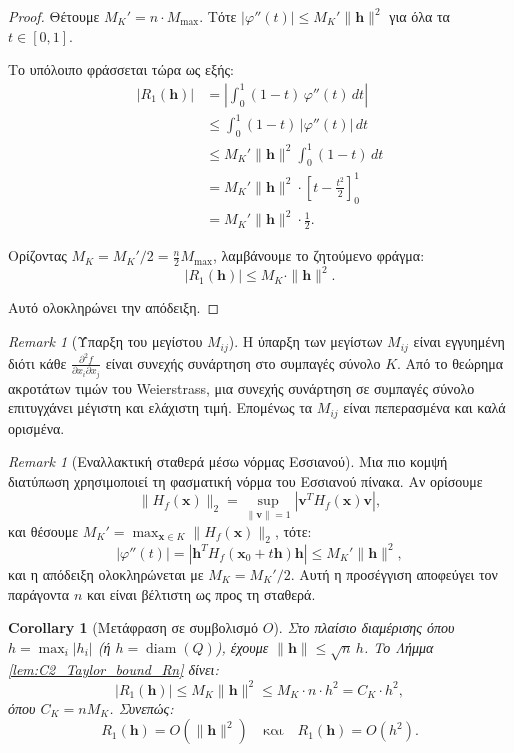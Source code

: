 \documentclass[10pt,a4paper,twoside,openany]{book}
\theoremstyle{plain}
\newtheorem{corollary}[theorem]{Corollary}
\theoremstyle{definition}
\theoremstyle{remark}
\newtheorem{remark}[theorem]{Remark}
\numberwithin{equation}{section}
\begin{document}
\begin{proof}
Θέτουμε \(M_K' = n \cdot M_{\max}\). Τότε \(|\varphi''(t)| \le M_K' \|\mathbf{h}\|^2\) για όλα τα \(t \in [0,1]\).

Το υπόλοιπο φράσσεται τώρα ως εξής:
\begin{align*}
|R_1(\mathbf{h})| &= \left| \int_0^1 (1-t) \, \varphi''(t) \, dt \right| \\
&\le \int_0^1 (1-t) \, |\varphi''(t)| \, dt \\
&\le M_K' \|\mathbf{h}\|^2 \int_0^1 (1-t) \, dt \\
&= M_K' \|\mathbf{h}\|^2 \cdot \left[ t - \frac{t^2}{2} \right]_0^1 \\
&= M_K' \|\mathbf{h}\|^2 \cdot \frac{1}{2}.
\end{align*}

Ορίζοντας \(M_K = M_K' / 2 = \frac{n}{2} M_{\max}\), λαμβάνουμε το ζητούμενο φράγμα:
\[
|R_1(\mathbf{h})| \le M_K \cdot \|\mathbf{h}\|^2.
\]

Αυτό ολοκληρώνει την απόδειξη.
\end{proof}

\begin{remark}[Ύπαρξη του μεγίστου \(M_{ij}\)]
Η ύπαρξη των μεγίστων \(M_{ij}\) είναι εγγυημένη διότι κάθε \(\frac{\partial^2 f}{\partial x_i \partial x_j}\) είναι συνεχής συνάρτηση στο συμπαγές σύνολο \(K\). Από το θεώρημα ακροτάτων τιμών του Weierstrass, μια συνεχής συνάρτηση σε συμπαγές σύνολο επιτυγχάνει μέγιστη και ελάχιστη τιμή. Επομένως τα \(M_{ij}\) είναι πεπερασμένα και καλά ορισμένα.
\end{remark}

\begin{remark}[Εναλλακτική σταθερά μέσω νόρμας Εσσιανού]
Μια πιο κομψή διατύπωση χρησιμοποιεί τη φασματική νόρμα του Εσσιανού πίνακα. Αν ορίσουμε
\[
\|H_f(\mathbf{x})\|_2 = \sup_{\|\mathbf{v}\|=1} |\mathbf{v}^T H_f(\mathbf{x}) \mathbf{v}|,
\]
και θέσουμε \(M_K' = \max_{\mathbf{x} \in K} \|H_f(\mathbf{x})\|_2\), τότε:
\[
|\varphi''(t)| = |\mathbf{h}^T H_f(\mathbf{x}_0 + t\mathbf{h}) \mathbf{h}| \le M_K' \|\mathbf{h}\|^2,
\]
και η απόδειξη ολοκληρώνεται με \(M_K = M_K' / 2\). Αυτή η προσέγγιση αποφεύγει τον παράγοντα \(n\) και είναι βέλτιστη ως προς τη σταθερά.
\end{remark}

\begin{corollary}[Μετάφραση σε συμβολισμό \(O\)]
\label{cor:O_translation_Rn}
Στο πλαίσιο διαμέρισης όπου \(h = \max_i |h_i|\) (ή \(h = \operatorname{diam}(Q)\)), έχουμε \(\|\mathbf{h}\| \le \sqrt{n} \, h\). Το Λήμμα \ref{lem:C2_Taylor_bound_Rn} δίνει:
\[
|R_1(\mathbf{h})| \le M_K \|\mathbf{h}\|^2 \le M_K \cdot n \cdot h^2 = C_K \cdot h^2,
\]
όπου \(C_K = n M_K\). Συνεπώς:
\[
R_1(\mathbf{h}) = O(\|\mathbf{h}\|^2) \quad \text{και} \quad R_1(\mathbf{h}) = O(h^2).
\]
\end{corollary}
\end{document}
